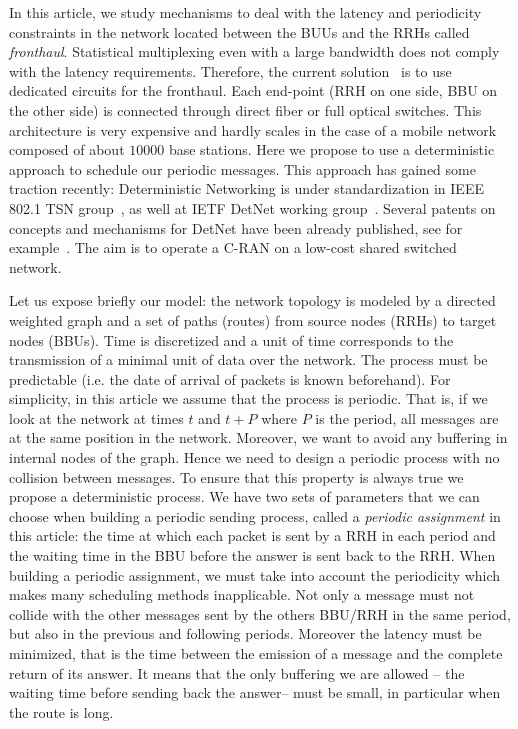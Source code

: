 \documentclass[10pt, conference, letterpaper]{IEEEtran}
\begin{document}
 In this article, we study mechanisms to deal with the latency and periodicity constraints in the network located between the BUUs and the RRHs called \emph{fronthaul}.
 Statistical multiplexing even with a large bandwidth does not comply with the latency requirements. Therefore, the current solution~\cite{pizzinat2015things,tayq2017real} is to use dedicated circuits for the fronthaul. Each end-point (RRH on one side, BBU on the other side) is connected through direct fiber or full optical switches. This architecture is very expensive and hardly scales in the case of a mobile network composed of about $10000$ base stations. Here we propose to use a deterministic approach to schedule our periodic messages. This approach has gained some traction recently: Deterministic Networking is under standardization in IEEE 802.1 TSN group~\cite{finn-detnet-architecture-08}, as well at IETF DetNet working group~\cite{ieee802}. Several patents on concepts and mechanisms for DetNet have been already published, see for example~\cite{howe2005time,leclerc2016transmission}. The aim is to operate a C-RAN on a low-cost shared switched network.
 
Let us expose briefly our model: the network topology is modeled by a directed weighted graph and a set of paths (routes) from source nodes (RRHs) to target nodes (BBUs). Time is discretized and a unit of time corresponds to the transmission of a minimal unit of data over the network. The process must be  predictable (i.e. the date of arrival of packets is known beforehand). For simplicity, in this article we assume that the process is periodic. That is, if we look at the network at times $t$ and $t+P$ where $P$ is the period, all messages are at the same position in the network. Moreover, we want to avoid any  buffering in internal nodes of the graph. Hence we need to design a periodic process with no collision between messages. To ensure that this property is always true we propose a deterministic process.  We have two sets of parameters that we can choose when building a periodic sending process, called a \emph{periodic assignment} in this article: the time at which each packet is sent by a RRH in each period and the waiting time in the BBU before the answer is sent back to the RRH. When building a periodic assignment, we must take into account the periodicity which makes many scheduling methods inapplicable. Not only a message must not collide with the other messages sent by the others BBU/RRH in the same period, but also in the previous and following periods. Moreover the latency must be minimized, that is the time 
 between the emission of a message and the complete return of its answer. It means that the only buffering we are allowed -- the waiting time before sending back the answer-- must be small, in particular when the route is long.
   
\end{document}
